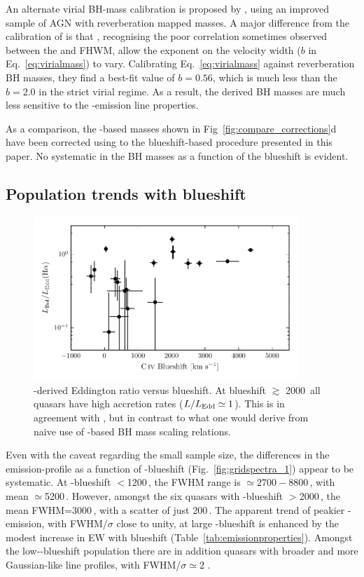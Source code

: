 An alternate virial BH-mass calibration is proposed by \citet{park13}, using an improved sample of AGN with reverberation mapped masses. 
A major difference from the calibration of \citet{vestergaard06} is that \citet{park13}, recognising the poor correlation sometimes observed between the  and \hb FHWM, allow the exponent on the velocity width ($b$ in Eq.~\ref{eq:virialmass}) to vary.
Calibrating Eq.~\ref{eq:virialmass} against reverberation BH masses, they find a best-fit value of $b=0.56$, which is much less than the $b=2.0$ in the strict virial regime. 
As a result, the derived BH masses are much less sensitive to the -emission line properties.

As a comparison, the -based masses shown in Fig~\ref{fig:compare_corrections}d have been corrected using to the  blueshift-based procedure presented in this paper. 
No systematic in the BH masses as a function of the  blueshift is evident. 

\subsection{Population trends with  blueshift}
\label{sec:hatrends}

\begin{figure}
    \includegraphics[width=10cm]{figures/chapter02/ha_edd_civ_bs.pdf}
    \caption{\hans-derived Eddington ratio versus  blueshift. At blueshift $\gtrsim$ 2000\kms\, all quasars have high accretion rates ($L/L_{\rm Edd} \simeq 1$). This is in agreement with \citet{kratzer15}, but in contrast to what one would derive from naive use of -based BH mass scaling relations.}
    \label{fig:ha_edd_civ_bs}
\end{figure}

Even with the caveat regarding the small sample size, the differences in the \ha emission-profile as a function of -blueshift (Fig.~\ref{fig:gridspectra_1}) appear to be systematic.
At -blueshift $<$1200\,\kms, the \ha FWHM range is $\simeq2700 - 8800$\,\kms, with mean $\simeq$5200\,\kms.
However, amongst the six quasars with -blueshift $>$2000\,\kms, the mean \ha FWHM=3000\,\kms, with a scatter of just 200\,\kms. 
The apparent trend of peakier \hans-emission, with FWHM/$\sigma$ close to unity, at large -blueshift is enhanced by the modest increase in \ha EW with blueshift (Table~\ref{tab:emissionproperties}). 
Amongst the low--blueshift population there are in addition quasars with broader and more Gaussian-like \ha line profiles, with FWHM/$\sigma \simeq 2$ . 

